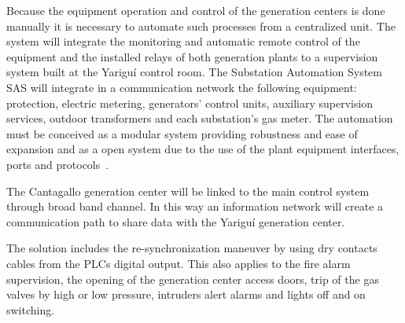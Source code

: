 Because the equipment operation and control of the generation centers
is done manually it is necessary to automate such processes from a
centralized unit. The system will integrate the monitoring and automatic
remote control of the equipment and the installed relays of both
generation plants to a supervision system built at the Yariguí control
room. The Substation Automation System SAS will integrate in a communication 
network the following equipment: protection, electric metering, generators' 
control units, auxiliary supervision services, outdoor transformers and each
substation's gas meter. The automation must be conceived as a modular
system providing robustness and ease of expansion and as a open system
due to the use of the plant equipment interfaces, ports and
protocols~\cite{neumann:2007}.

The Cantagallo generation center will be linked to the main control system
through broad band channel. In this way an information network will create 
a communication path to share data with the Yariguí generation center.

The solution includes the re-synchronization maneuver by using dry
contacts cables from the PLCs digital output. This also applies to
the fire alarm supervision, the opening of the generation center
access doors, trip of the gas valves by high or low pressure,
intruders alert alarms and lights off and on switching.
